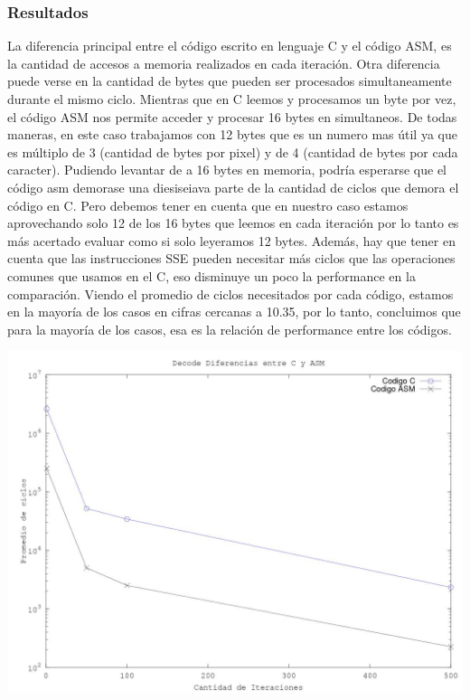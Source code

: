 \subsubsection{Resultados}
La diferencia principal entre el c\'odigo escrito en lenguaje C y el c\'odigo ASM, es la cantidad de accesos a memoria realizados en cada iteraci\'on. Otra diferencia puede verse en la cantidad de bytes que pueden ser procesados simultaneamente durante el mismo ciclo. Mientras que en C leemos y procesamos un byte por vez, el c\'odigo ASM nos permite acceder y procesar 16 bytes en simultaneos. De todas maneras, en este caso trabajamos con 12 bytes que es un numero mas \'util ya que es m\'ultiplo de 3 (cantidad de bytes por pixel)  y de 4 (cantidad de bytes por cada caracter).\newline
Pudiendo levantar de a 16 bytes en memoria, podr\'ia esperarse que el c\'odigo asm demorase una diesiseiava parte de la cantidad de ciclos que demora el c\'odigo en C. Pero debemos tener en cuenta que en nuestro caso estamos aprovechando solo 12 de los 16 bytes que leemos en cada iteraci\'on por lo tanto es más acertado evaluar como si solo leyeramos 12 bytes. Adem\'as, hay que tener en cuenta que las instrucciones SSE pueden necesitar más ciclos que las operaciones comunes que usamos en el C, eso disminuye un poco la performance en la comparación. Viendo el promedio de ciclos necesitados por cada c\'odigo, estamos en la mayor\'ia de los casos en cifras cercanas a 10.35, por lo tanto, concluimos que para la mayoría de los casos, esa es la relaci\'on de performance entre los códigos.
\newline

\includegraphics[scale=0.7]{imagenes/DecodeDiferencias.jpg}

